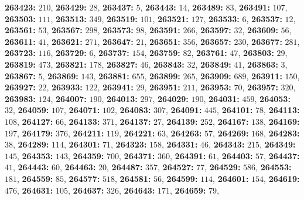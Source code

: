 \textsf{\bfseries 263423:} $210$, \textsf{\bfseries 263429:} $28$, \textsf{\bfseries 263437:} $5$, \textsf{\bfseries 263443:} $14$, \textsf{\bfseries 263489:} $83$, \textsf{\bfseries 263491:} $107$, \textsf{\bfseries 263503:} $111$, \textsf{\bfseries 263513:} $349$, \textsf{\bfseries 263519:} $101$, \textsf{\bfseries 263521:} $127$, \textsf{\bfseries 263533:} $6$, \textsf{\bfseries 263537:} $12$, \textsf{\bfseries 263561:} $53$, \textsf{\bfseries 263567:} $298$, \textsf{\bfseries 263573:} $98$, \textsf{\bfseries 263591:} $266$, \textsf{\bfseries 263597:} $32$, \textsf{\bfseries 263609:} $56$, \textsf{\bfseries 263611:} $41$, \textsf{\bfseries 263621:} $271$, \textsf{\bfseries 263647:} $21$, \textsf{\bfseries 263651:} $356$, \textsf{\bfseries 263657:} $230$, \textsf{\bfseries 263677:} $281$, \textsf{\bfseries 263723:} $116$, \textsf{\bfseries 263729:} $6$, \textsf{\bfseries 263737:} $154$, \textsf{\bfseries 263759:} $82$, \textsf{\bfseries 263761:} $47$, \textsf{\bfseries 263803:} $29$, \textsf{\bfseries 263819:} $473$, \textsf{\bfseries 263821:} $178$, \textsf{\bfseries 263827:} $46$, \textsf{\bfseries 263843:} $32$, \textsf{\bfseries 263849:} $41$, \textsf{\bfseries 263863:} $3$, \textsf{\bfseries 263867:} $5$, \textsf{\bfseries 263869:} $143$, \textsf{\bfseries 263881:} $655$, \textsf{\bfseries 263899:} $265$, \textsf{\bfseries 263909:} $689$, \textsf{\bfseries 263911:} $150$, \textsf{\bfseries 263927:} $22$, \textsf{\bfseries 263933:} $122$, \textsf{\bfseries 263941:} $29$, \textsf{\bfseries 263951:} $211$, \textsf{\bfseries 263953:} $70$, \textsf{\bfseries 263957:} $320$, \textsf{\bfseries 263983:} $124$, \textsf{\bfseries 264007:} $190$, \textsf{\bfseries 264013:} $297$, \textsf{\bfseries 264029:} $190$, \textsf{\bfseries 264031:} $459$, \textsf{\bfseries 264053:} $32$, \textsf{\bfseries 264059:} $107$, \textsf{\bfseries 264071:} $102$, \textsf{\bfseries 264083:} $307$, \textsf{\bfseries 264091:} $445$, \textsf{\bfseries 264101:} $78$, \textsf{\bfseries 264113:} $108$, \textsf{\bfseries 264127:} $66$, \textsf{\bfseries 264133:} $371$, \textsf{\bfseries 264137:} $27$, \textsf{\bfseries 264139:} $252$, \textsf{\bfseries 264167:} $138$, \textsf{\bfseries 264169:} $197$, \textsf{\bfseries 264179:} $376$, \textsf{\bfseries 264211:} $119$, \textsf{\bfseries 264221:} $63$, \textsf{\bfseries 264263:} $57$, \textsf{\bfseries 264269:} $168$, \textsf{\bfseries 264283:} $38$, \textsf{\bfseries 264289:} $114$, \textsf{\bfseries 264301:} $71$, \textsf{\bfseries 264323:} $158$, \textsf{\bfseries 264331:} $46$, \textsf{\bfseries 264343:} $215$, \textsf{\bfseries 264349:} $145$, \textsf{\bfseries 264353:} $143$, \textsf{\bfseries 264359:} $700$, \textsf{\bfseries 264371:} $360$, \textsf{\bfseries 264391:} $61$, \textsf{\bfseries 264403:} $57$, \textsf{\bfseries 264437:} $41$, \textsf{\bfseries 264443:} $60$, \textsf{\bfseries 264463:} $20$, \textsf{\bfseries 264487:} $357$, \textsf{\bfseries 264527:} $77$, \textsf{\bfseries 264529:} $586$, \textsf{\bfseries 264553:} $181$, \textsf{\bfseries 264559:} $85$, \textsf{\bfseries 264577:} $518$, \textsf{\bfseries 264581:} $56$, \textsf{\bfseries 264599:} $114$, \textsf{\bfseries 264601:} $154$, \textsf{\bfseries 264619:} $476$, \textsf{\bfseries 264631:} $105$, \textsf{\bfseries 264637:} $326$, \textsf{\bfseries 264643:} $171$, \textsf{\bfseries 264659:} $79$, 
